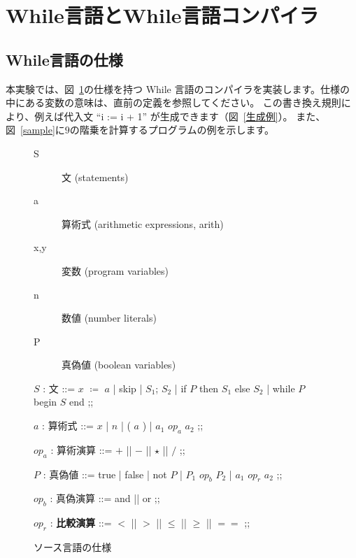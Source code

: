 \documentclass[a4paper,11pt]{jsarticle}
\begin{document}
\section{While言語とWhile言語コンパイラ}
\label{sec:while_lang}

\subsection{While言語の仕様}

本実験では、図~\ref{spec}の仕様を持つ While 言語のコンパイラを実装します。仕様の中にある変数の意味は、直前の定義を参照してください。
この書き換え規則により、例えば代入文 ``\textsf{i := i + 1}'' が生成できます（図~\ref{生成例}）。
また、図~\ref{sample}に$9$の階乗を計算するプログラムの例を示します。

\begin{figure}[H]
  \centering
  \begin{description}
\item[S] 文 (statements)
\item[a] 算術式 (arithmetic expressions, arith)
\item[x,y] 変数 (program variables)
\item[n] 数値 (number literals)
\item[P] 真偽値 (boolean variables)
\end{description}

\begin{bnf}
  $S$ : \textsf{文} ::= $x$ $\coloneq$ $a$
  | skip
  | $S_1$; $S_2$
  | if $P$ then $S_1$ else $S_2$
  | while $P$ begin $S$ end
  ;;

  $a$ : \textsf{算術式} ::= $x$
  | $n$
  | ( $a$ )
  | $a_1$ $op_a$ $a_2$
  ;;

  $op_a$ : \textsf{算術演算} ::= $+$ || $-$ || $\star$ || $/$
  ;;

  $P$ : \textsf{真偽値} ::= true
  | false
  | not $P$
  | $P_1$ $op_b$ $P_2$
  | $a_1$ $op_r$ $a_2$
  ;;

  $op_b$ : \textsf{真偽演算} ::= and || or
  ;;

  $op_r$ : \textbf{比較演算} ::= $<$ || $>$ || $\leq$ || $\geq$ || $==$
  ;;
\end{bnf}
  \caption{ソース言語の仕様}\label{spec}
\end{figure}
\end{document}
